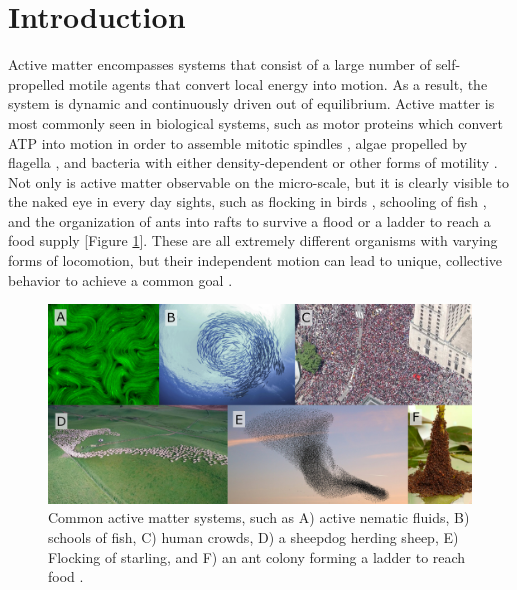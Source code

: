 \documentclass[11pt]{article}
\begin{document}


\section{Introduction}
\label{S:1}
Active matter encompasses systems that consist of a large number of self-propelled motile agents that convert local energy into motion. As a result, the system is dynamic and continuously driven out of equilibrium.  Active matter is most commonly seen in biological systems, such as motor proteins which convert ATP into motion in order to assemble mitotic spindles \cite{Schliwa, Oriola}, algae propelled by flagella \cite{Drescher}, and bacteria with either density-dependent \cite{Zhang} or other forms of motility \cite{Peruani}.  Not only is active matter observable on the micro-scale, but it is clearly visible to the naked eye in every day sights, such as flocking in birds \cite{Ballerini}, schooling of fish  \cite{Lopez}, and the organization of ants into rafts to survive a flood \cite{Mlot} or a ladder to reach a food supply \cite{Hu} [Figure \ref{fig:ActiveMatter}]. These are all extremely different organisms with varying forms of locomotion, but their independent motion can lead to unique, collective behavior to achieve a common goal \cite{Zohdi}.  

\begin{figure}[ht]
\centering\includegraphics[width=1.0\linewidth]{Untitled.png}
\caption{Common active matter systems, such as A) active nematic fluids, B) schools of fish, C) human crowds, D) a sheepdog herding sheep, E) Flocking of starling, and F) an ant colony forming a ladder to reach food \cite{Hu}.}
\label{fig:ActiveMatter}
\end{figure}
\end{document}
